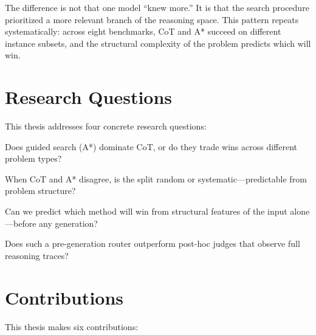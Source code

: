 The difference is not that one model ``knew more.'' It is that the search procedure prioritized a more relevant branch of the reasoning space. This pattern repeats systematically: across eight benchmarks, CoT and A* succeed on different instance subsets, and the structural complexity of the problem predicts which will win.

\section{Research Questions}

This thesis addresses four concrete research questions:

\begin{description}[leftmargin=1.5cm, labelwidth=1.2cm]
\item[\textbf{RQ1}] Does guided search (A*) dominate CoT, or do they trade wins across different problem types?
\item[\textbf{RQ2}] When CoT and A* disagree, is the split random or systematic---predictable from problem structure?
\item[\textbf{RQ3}] Can we predict which method will win from structural features of the input alone---before any generation?
\item[\textbf{RQ4}] Does such a pre-generation router outperform post-hoc judges that observe full reasoning traces?
\end{description}

\section{Contributions}

This thesis makes six contributions:

